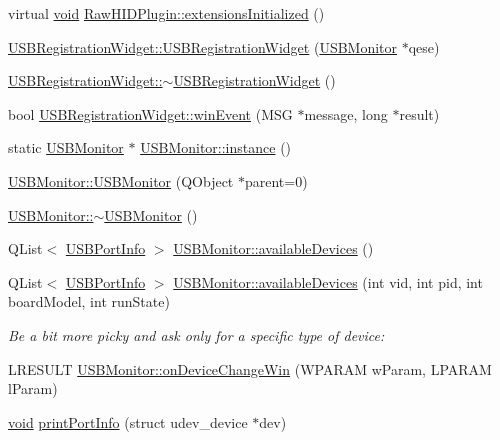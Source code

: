 \begin{DoxyCompactItemize}
\item 
virtual \hyperlink{group___u_a_v_objects_plugin_ga444cf2ff3f0ecbe028adce838d373f5c}{void} \hyperlink{group___raw_h_i_d_plugin_ga59b1e6d264de04d48bb83b823f91a5fe}{\-Raw\-H\-I\-D\-Plugin\-::extensions\-Initialized} ()
\item 
\hyperlink{group___raw_h_i_d_plugin_gaeaf0fb927142afa4e4233bfbd8fcb989}{\-U\-S\-B\-Registration\-Widget\-::\-U\-S\-B\-Registration\-Widget} (\hyperlink{class_u_s_b_monitor}{\-U\-S\-B\-Monitor} $\ast$qese)
\item 
\hyperlink{group___raw_h_i_d_plugin_gaba711458acab7c2f26fbe576a10291c2}{\-U\-S\-B\-Registration\-Widget\-::$\sim$\-U\-S\-B\-Registration\-Widget} ()
\item 
bool \hyperlink{group___raw_h_i_d_plugin_gacce70fd01437c66b524cc2f512ceece6}{\-U\-S\-B\-Registration\-Widget\-::win\-Event} (\-M\-S\-G $\ast$message, long $\ast$result)
\item 
static \hyperlink{class_u_s_b_monitor}{\-U\-S\-B\-Monitor} $\ast$ \hyperlink{group___raw_h_i_d_plugin_gabcb44085db71f0bd0a1513d25a572b33}{\-U\-S\-B\-Monitor\-::instance} ()
\item 
\hyperlink{group___raw_h_i_d_plugin_ga1de6bdbd3deee4991e3b910e6d274121}{\-U\-S\-B\-Monitor\-::\-U\-S\-B\-Monitor} (\-Q\-Object $\ast$parent=0)
\item 
\hyperlink{group___raw_h_i_d_plugin_ga0a472129bd25e3c7972ce78ca52ed19d}{\-U\-S\-B\-Monitor\-::$\sim$\-U\-S\-B\-Monitor} ()
\item 
\-Q\-List$<$ \hyperlink{struct_u_s_b_port_info}{\-U\-S\-B\-Port\-Info} $>$ \hyperlink{group___raw_h_i_d_plugin_gaf7da3cc1fc2b9085f5647f0d3822ade1}{\-U\-S\-B\-Monitor\-::available\-Devices} ()
\item 
\-Q\-List$<$ \hyperlink{struct_u_s_b_port_info}{\-U\-S\-B\-Port\-Info} $>$ \hyperlink{group___raw_h_i_d_plugin_ga8b0ce433f3d1f5907b290b1f4185984d}{\-U\-S\-B\-Monitor\-::available\-Devices} (int vid, int pid, int board\-Model, int run\-State)
\begin{DoxyCompactList}\small\item\em \-Be a bit more picky and ask only for a specific type of device\-: \end{DoxyCompactList}\item 
\-L\-R\-E\-S\-U\-L\-T \hyperlink{group___raw_h_i_d_plugin_ga108b55e821dbc91874e52cdb7cb71150}{\-U\-S\-B\-Monitor\-::on\-Device\-Change\-Win} (\-W\-P\-A\-R\-A\-M w\-Param, \-L\-P\-A\-R\-A\-M l\-Param)
\item 
\hyperlink{group___u_a_v_objects_plugin_ga444cf2ff3f0ecbe028adce838d373f5c}{void} \hyperlink{group___raw_h_i_d_plugin_ga8674891a6b7805cdda191e41eee8f67f}{print\-Port\-Info} (struct udev\-\_\-device $\ast$dev)
\end{DoxyCompactItemize}
